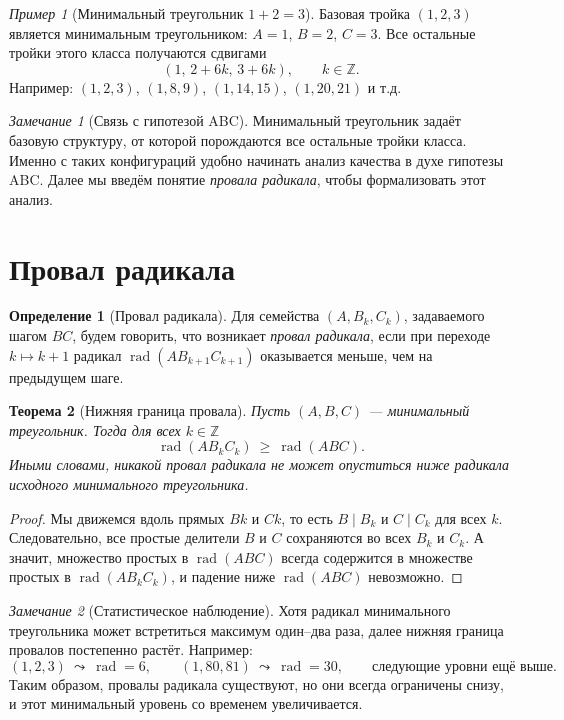 \documentclass[12pt,a4paper]{article}
\newcommand{\Z}{\mathbb{Z}}
\DeclareMathOperator{\rad}{rad}
\theoremstyle{definition}
\newtheorem{definition}{Определение}[section]
\theoremstyle{plain}
\newtheorem{theorem}[definition]{Теорема}
\theoremstyle{remark}
\newtheorem*{remark}{Замечание}
\newtheorem*{example}{Пример}
\begin{document}
\begin{example}[Минимальный треугольник $1+2=3$]
Базовая тройка $(1,2,3)$ является минимальным треугольником: $A=1$, $B=2$, $C=3$.
Все остальные тройки этого класса получаются сдвигами
\[
(1,\,2+6k,\,3+6k),\qquad k\in\Z.
\]
Например: $(1,2,3)$, $(1,8,9)$, $(1,14,15)$, $(1,20,21)$ и т.д.
\end{example}

\begin{remark}[Связь с гипотезой ABC]
Минимальный треугольник задаёт базовую структуру, от которой порождаются все остальные тройки класса.
Именно с таких конфигураций удобно начинать анализ качества в духе гипотезы ABC. 
Далее мы введём понятие \emph{провала радикала}, чтобы формализовать этот анализ.
\end{remark}


\section{Провал радикала}

\begin{definition}[Провал радикала]
Для семейства $(A,B_k,C_k)$, задаваемого шагом $BC$, будем говорить,
что возникает \emph{провал радикала}, если при переходе $k \mapsto k+1$
радикал $\rad(A B_{k+1} C_{k+1})$ оказывается меньше, чем на предыдущем шаге.
\end{definition}

\begin{theorem}[Нижняя граница провала]
Пусть $(A,B,C)$ — минимальный треугольник. Тогда для всех $k\in\Z$
\[
\rad(A B_k C_k)\ \ge\ \rad(ABC).
\]
Иными словами, никакой провал радикала не может опуститься ниже радикала
исходного минимального треугольника.
\end{theorem}

\begin{proof}
Мы движемся вдоль прямых $Bk$ и $Ck$, то есть $B\mid B_k$ и $C\mid C_k$ для всех $k$.
Следовательно, все простые делители $B$ и $C$ сохраняются во всех $B_k$ и $C_k$.
А значит, множество простых в $\rad(ABC)$ всегда содержится в множестве простых
в $\rad(A B_k C_k)$, и падение ниже $\rad(ABC)$ невозможно.
\end{proof}

\begin{remark}[Статистическое наблюдение]
Хотя радикал минимального треугольника может встретиться максимум один–два раза,
далее нижняя граница провалов постепенно растёт. Например:
\[
(1,2,3)\ \leadsto\ \rad=6,\qquad
(1,80,81)\ \leadsto\ \rad=30,\qquad
\text{следующие уровни ещё выше.}
\]
Таким образом, провалы радикала существуют, но они всегда ограничены снизу,
и этот минимальный уровень со временем увеличивается.
\end{remark}
\end{document}
